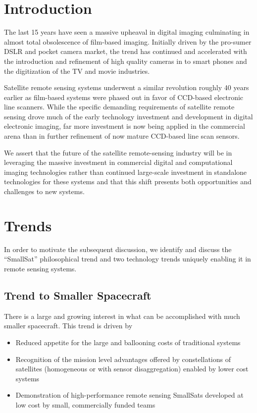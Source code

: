 \documentclass[10pt,journal]{IEEEtran}  %
\begin{document}
\maketitle

\IEEEdisplaynontitleabstractindextext

\tableofcontents

\section{Introduction}
\label{sec:introduction}

The last 15 years have seen a massive upheaval in digital imaging culminating in almost total obsolescence of film-based imaging.  Initially driven by the pro-sumer DSLR and pocket camera market, the trend has continued and accelerated with the introduction and refinement of high quality cameras in to smart phones and the digitization of the TV and movie industries.

Satellite remote sensing systems underwent a similar revolution roughly 40 years earlier as film-based systems were phased out in favor of CCD-based electronic line scanners.  While the specific demanding requirements of satellite remote sensing drove much of the early technology investment and development in digital electronic imaging, far more investment is now being applied in the commercial arena than in further refinement of now mature CCD-based line scan sensors.

We assert that the future of the satellite remote-sensing industry will be in leveraging the massive investment in commercial digital and computational imaging technologies rather than continued large-scale investment in standalone technologies for these systems and that this shift presents both opportunities and challenges to new systems.

\section{Trends}
In order to motivate the subsequent discussion, we identify and discuss the ``SmallSat'' philosophical trend and two technology trends uniquely enabling it in remote sensing systems.

\subsection{Trend to Smaller Spacecraft}

\label{sec:smallsat}
There is a large and growing interest in what can be accomplished with much smaller spacecraft.  This trend is driven by 
\begin{itemize}
    \item Reduced appetite for the large and ballooning costs of traditional systems
    \item Recognition of the mission level advantages offered by constellations of satellites (homogeneous or with sensor disaggregation) enabled by lower cost systems
    \item Demonstration of high-performance remote sensing SmallSats developed at low cost by small, commercially funded teams
\end{itemize} 
\end{document}
